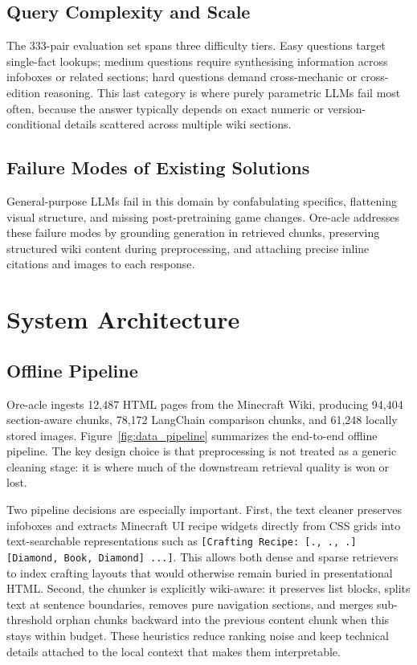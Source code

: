 \documentclass[11pt,a4paper]{article}
\begin{document}
\subsection{Query Complexity and Scale}

The 333-pair evaluation set spans three difficulty tiers. Easy questions target single-fact lookups; medium questions require synthesising information across infoboxes or related sections; hard questions demand cross-mechanic or cross-edition reasoning. This last category is where purely parametric LLMs fail most often, because the answer typically depends on exact numeric or version-conditional details scattered across multiple wiki sections.

\subsection{Failure Modes of Existing Solutions}

General-purpose LLMs fail in this domain by confabulating specifics, flattening visual structure, and missing post-pretraining game changes. Ore-acle addresses these failure modes by grounding generation in retrieved chunks, preserving structured wiki content during preprocessing, and attaching precise inline citations and images to each response.

\section{System Architecture}

\subsection{Offline Pipeline}

Ore-acle ingests 12,487 HTML pages from the Minecraft Wiki, producing 94,404 section-aware chunks, 78,172 LangChain comparison chunks, and 61,248 locally stored images. Figure~\ref{fig:data_pipeline} summarizes the end-to-end offline pipeline. The key design choice is that preprocessing is not treated as a generic cleaning stage: it is where much of the downstream retrieval quality is won or lost.

Two pipeline decisions are especially important. First, the text cleaner preserves infoboxes and extracts Minecraft UI recipe widgets directly from CSS grids into text-searchable representations such as \texttt{[Crafting Recipe: [., ., .] [Diamond, Book, Diamond] ...]}. This allows both dense and sparse retrievers to index crafting layouts that would otherwise remain buried in presentational HTML. Second, the chunker is explicitly wiki-aware: it preserves list blocks, splits text at sentence boundaries, removes pure navigation sections, and merges sub-threshold orphan chunks backward into the previous content chunk when this stays within budget. These heuristics reduce ranking noise and keep technical details attached to the local context that makes them interpretable.
\end{document}
